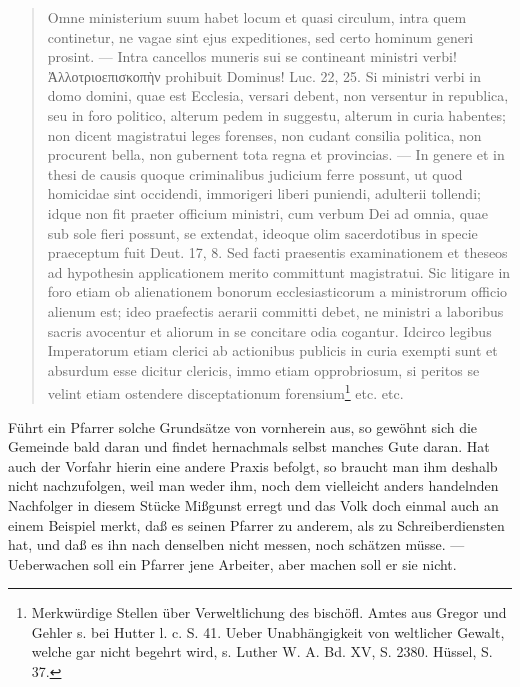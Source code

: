 \begin{quote}
Omne ministerium suum habet locum et quasi circulum, intra quem continetur, ne vagae sint ejus expeditiones, sed certo hominum generi prosint. — Intra cancellos muneris sui se contineant ministri verbi! Ἀλλοτριοεπισκοπὴν prohibuit Dominus! Luc. 22, 25. Si ministri verbi in domo domini, quae est Ecclesia, versari debent, non versentur in republica, seu in foro politico, alterum pedem in suggestu, alterum in curia habentes; non dicent magistratui leges forenses, non cudant consilia politica, non procurent bella, non gubernent tota regna et provincias. — In genere et in thesi de causis quoque criminalibus judicium ferre possunt, ut quod homicidae sint occidendi, immorigeri liberi puniendi, adulterii tollendi; idque non fit praeter officium ministri, cum verbum Dei ad omnia, quae sub sole fieri possunt, se extendat, ideoque olim sacerdotibus in specie praeceptum fuit Deut. 17, 8. Sed facti praesentis examinationem et theseos ad hypothesin applicationem
merito committunt magistratui. Sic litigare in foro etiam ob alienationem bonorum ecclesiasticorum a ministrorum officio alienum est; ideo praefectis aerarii committi debet, ne ministri a laboribus sacris avocentur et aliorum in se concitare odia cogantur. Idcirco legibus Imperatorum etiam clerici ab actionibus publicis in curia exempti sunt et absurdum esse dicitur clericis, immo etiam opprobriosum, si peritos se velint etiam ostendere disceptationum forensium\footnote{Merkwürdige Stellen über Verweltlichung des bischöfl. Amtes aus Gregor und Gehler s. bei Hutter l. c. S. 41. Ueber Unabhängigkeit von weltlicher Gewalt, welche gar nicht begehrt wird, s. Luther W. A. Bd. XV, S. 2380. Hüssel, S. 37.} etc. etc.
\end{quote}

Führt ein Pfarrer solche Grundsätze von vornherein aus, so gewöhnt sich die Gemeinde bald daran und findet hernachmals selbst manches Gute daran. Hat auch der Vorfahr hierin eine andere Praxis befolgt, so braucht man ihm deshalb nicht nachzufolgen, weil man weder ihm, noch dem vielleicht anders handelnden Nachfolger in diesem Stücke Mißgunst erregt und das Volk doch einmal auch an einem Beispiel merkt, daß es seinen Pfarrer zu anderem, als zu Schreiberdiensten hat, und daß es ihn nach denselben nicht messen, noch schätzen müsse. — Ueberwachen soll ein Pfarrer jene Arbeiter, aber machen soll er sie nicht.

